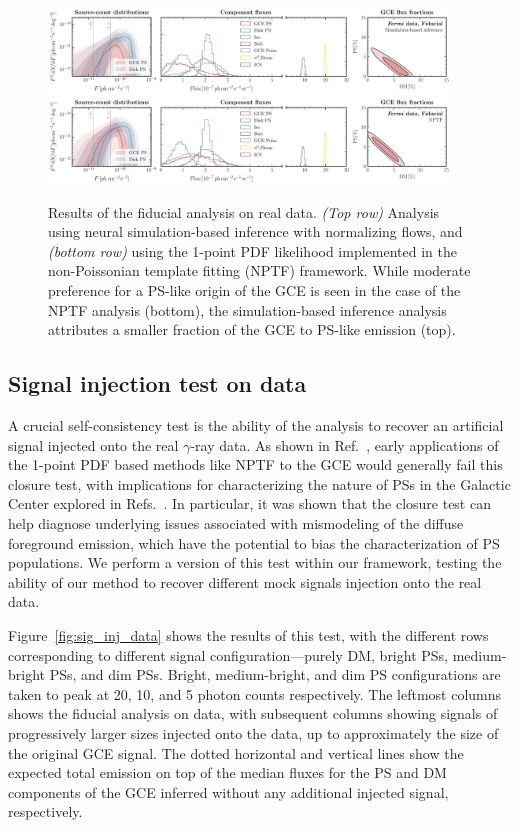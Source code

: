 \documentclass[prd,aps,10pt,nofootinbib,twocolumn,superscriptaddress,preprintnumbers,balancelastpage,longbibliography]{revtex4-1}
\begin{document}
%
\begin{figure}
\centering
\includegraphics[width=0.95\textwidth]{plots/data_fid_sbi.pdf}
\includegraphics[width=0.95\textwidth]{plots/data_fid_nptf.pdf}
\caption{Results of the fiducial analysis on real \Fermi data. \emph{(Top row)} Analysis using neural simulation-based inference with normalizing flows, and \emph{(bottom row)} using the 1-point PDF likelihood implemented in the non-Poissonian template fitting (NPTF) framework. While moderate preference for a PS-like origin of the GCE is seen in the case of the NPTF analysis (bottom), the simulation-based inference analysis attributes a smaller fraction of the GCE to PS-like emission (top).}
\label{fig:fid_data}
\end{figure}
%

\subsection{Signal injection test on data}
\label{sec:sig-injection}

A crucial self-consistency test is the ability of the analysis to recover an artificial signal injected onto the real $\gamma$-ray data. As shown in Ref.~\cite{Leane:2019xiy}, early applications of the 1-point PDF based methods like NPTF to the GCE would generally fail this closure test, with implications for characterizing the nature of PSs in the Galactic Center explored in Refs.~\cite{Chang:2019ars,Buschmann:2020adf}. In particular, it was shown that the closure test can help diagnose underlying issues associated with mismodeling of the diffuse foreground emission, which have the potential to bias the characterization of PS populations. We perform a version of this test within our framework, testing the ability of our method to recover different mock signals injection onto the real \Fermi data.

Figure~\ref{fig:sig_inj_data} shows the results of this test, with the different rows corresponding to different signal configuration---purely DM, bright PSs, medium-bright PSs, and dim PSs. Bright, medium-bright, and dim PS configurations are taken to peak at 20, 10, and 5 photon counts respectively. The leftmost columns shows the fiducial analysis on \Fermi data, with subsequent columns showing signals of progressively larger sizes injected onto the data, up to approximately the size of the original GCE signal. The dotted horizontal and vertical lines show the expected total emission on top of the median fluxes for the PS and DM components of the GCE inferred without any additional injected signal, respectively. 
\end{document}
